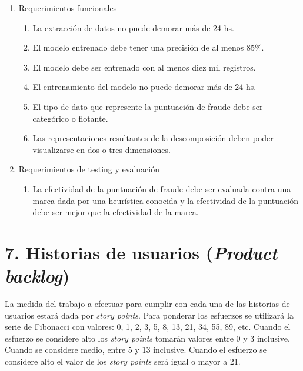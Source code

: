 \documentclass[
11pt, %
]{charter}
\begin{document}
\begin{enumerate}
	\item Requerimientos funcionales
		\begin{enumerate}
			\item La extracción de datos no puede demorar más de 24 hs.
			\item El modelo entrenado debe tener una precisión de al menos 85\%.
			\item El modelo debe ser entrenado con al menos diez mil registros.
			\item El entrenamiento del modelo no puede demorar más de 24 hs.
			\item El tipo de dato que represente la puntuación de fraude debe ser categórico o flotante.
			\item Las representaciones resultantes de la descomposición deben poder visualizarse en dos o tres dimensiones.
		\end{enumerate}
	\item Requerimientos de testing y evaluación
		\begin{enumerate}
			\item La efectividad de la puntuación de fraude debe ser evaluada contra una marca dada por una heurística conocida y la efectividad de la puntuación debe ser mejor que la efectividad de la marca.
		\end{enumerate}
\end{enumerate}

\section{7. Historias de usuarios (\textit{Product backlog})}
\label{sec:backlog}
La medida del trabajo a efectuar para cumplir con cada una de las historias de usuarios estará dada por \emph{story points}. Para ponderar los esfuerzos se utilizará la serie de Fibonacci con valores: 0, 1, 2, 3, 5, 8, 13, 21, 34, 55, 89, etc. Cuando el esfuerzo se considere alto los \emph{story points} tomarán valores entre 0 y 3 inclusive. Cuando se considere medio, entre 5 y 13 inclusive. Cuando el esfuerzo se considere alto el valor de los \emph{story points} será igual o mayor a 21.
\end{document}
